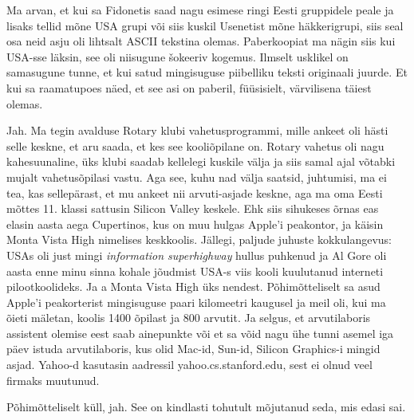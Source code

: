 
Ma arvan, et kui sa Fidonetis saad nagu esimese ringi Eesti gruppidele peale ja lisaks tellid  mõne USA grupi või siis kuskil Usenetist mõne häkkerigrupi, siis seal osa neid asju oli lihtsalt ASCII tekstina olemas. Paberkoopiat ma nägin siis kui USA-sse läksin, see oli  niisugune šokeeriv kogemus. Ilmselt usklikel on samasugune tunne, et kui satud mingisuguse piibelliku teksti originaali juurde. Et kui sa raamatupoes näed, et see asi on paberil, füüsisielt, värvilisena täiest olemas. 


Jah. Ma tegin avalduse Rotary klubi vahetusprogrammi, mille ankeet oli hästi selle keskne, et aru saada, et kes see kooliõpilane on. Rotary vahetus oli nagu kahesuunaline, üks klubi saadab kellelegi kuskile välja ja siis samal ajal võtabki mujalt vahetusõpilasi vastu. Aga see, kuhu nad välja saatsid, juhtumisi, ma ei tea, kas sellepärast, et mu ankeet nii arvuti-asjade keskne, aga ma oma Eesti mõttes 11. klassi sattusin Silicon Valley keskele. Ehk siis sihukeses õrnas eas elasin aasta aega Cupertinos, kus on muu hulgas Apple'i peakontor, ja käisin Monta Vista High nimelises keskkoolis. Jällegi,  paljude juhuste kokkulangevus: USAs oli just mingi \emph{information superhighway} hullus puhkenud ja Al Gore oli aasta enne minu sinna kohale jõudmist USA-s viis kooli kuulutanud  interneti pilootkoolideks.  Ja a Monta Vista High üks nendest. Põhimõtteliselt sa asud Apple'i peakorterist mingisuguse paari kilomeetri kaugusel ja meil oli, kui ma õieti mäletan, koolis 1400 õpilast ja 800 arvutit. Ja selgus, et arvutilaboris assistent olemise eest saab ainepunkte või et sa võid nagu ühe tunni asemel iga päev istuda arvutilaboris, kus olid Mac-id, Sun-id, Silicon Graphics-i mingid asjad. Yahoo-d kasutasin aadressil yahoo.cs.stanford.edu, sest ei olnud veel firmaks muutunud.


Põhimõtteliselt küll, jah. See  on kindlasti tohutult mõjutanud seda, mis edasi sai. 


